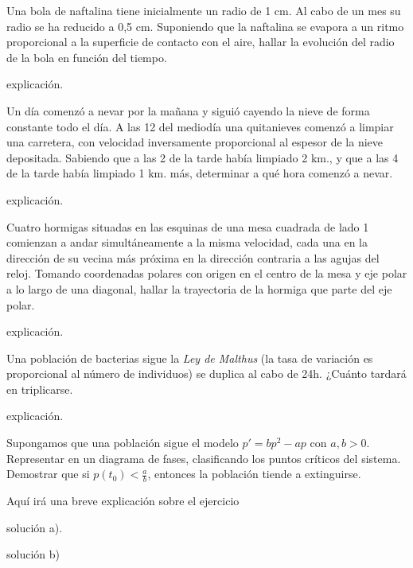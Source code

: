 \documentclass[nochap]{apuntes}
\begin{document}
\newpage
\begin{problem}[16]
Una bola de naftalina tiene inicialmente un radio de 1 cm. Al cabo de un mes su radio se ha reducido a 0,5 cm. Suponiendo que la naftalina se evapora a un ritmo proporcional a la superficie de contacto con el aire, hallar la evolución del radio de la bola en función del tiempo.
\solution
\begin{expla}
explicación.
\end{expla}
\end{problem}
\newpage
\begin{problem}[17]
Un día comenzó a nevar por la mañana y siguió cayendo la nieve de forma constante todo el día. A las 12 del mediodía una quitanieves comenzó a limpiar una carretera, con velocidad inversamente proporcional al espesor de la nieve depositada. Sabiendo que a las 2 de la tarde había limpiado 2 km., y que a las 4 de la tarde había limpiado 1 km. más, determinar a qué hora comenzó a nevar. 
\solution
\begin{expla}
explicación.
\end{expla}
\end{problem}
\newpage
\begin{problem}[18]
Cuatro hormigas situadas en las esquinas de una mesa cuadrada de lado 1 comienzan a andar simultáneamente a la misma velocidad, cada una en la dirección de su vecina más próxima en la dirección contraria a las agujas del reloj. Tomando coordenadas polares con origen en el centro de la mesa y eje polar a lo largo de una diagonal, hallar la trayectoria de la hormiga que parte del eje polar.
\solution
\begin{expla}
explicación.
\end{expla}
\end{problem}
\newpage
\begin{problem}[19]
Una población de bacterias sigue la \textit{Ley de Malthus} (la tasa de variación es proporcional al número de individuos) se duplica al cabo de 24h. ¿Cuánto tardará en triplicarse.
\solution
\begin{expla}
explicación.
\end{expla}
\end{problem}
\newpage
\begin{problem}[20]
Supongamos que una población sigue el modelo $p'=bp^2-ap$ con $a,b>0$.
\ppart
Representar en un diagrama de fases, clasificando los puntos críticos del sistema.
\ppart
Demostrar que si $p(t_0)<\frac{a}{b} $, entonces la población tiende a extinguirse.

\solution

\begin{expla}
Aquí irá una breve explicación sobre el ejercicio
\end{expla}

\spart
solución a).

\spart
solución b)

\end{problem}
\end{document}
